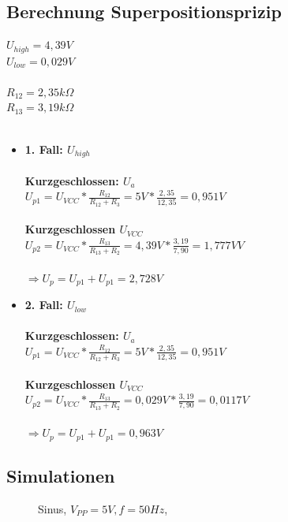 \subsection{Berechnung Superpositionsprizip}
$U_{high}=4,39V$ \\
$U_{low}=0,029V$ \\ \\
$R_{12}=2,35k\Omega$ \\
$R_{13}=3,19k\Omega$ \\ \\
\begin{itemize}
  \item \textbf{1. Fall: $U_{high}$} \\ \\
        \textbf{Kurzgeschlossen: $U_a$ }\\
        $U_{p1} = U_{VCC}*\frac{R_{12}}{R_{12}+R_3} = 5V * \frac{2,35}{12,35} = 0,951V$ \\ \\
        \textbf{Kurzgeschlossen $U_{VCC}$}\\
        $U_{p2} = U_{VCC}*\frac{R_{13}}{R_{13}+R_2} = 4,39V * \frac{3,19}{7,90} = 1,777VV$ \\ \\
        $\Rightarrow U_p = U_{p1} + U_{p1} = 2,728V$

  \item \textbf{2. Fall: $U_{low}$} \\ \\
        \textbf{Kurzgeschlossen: $U_a$ }\\
        $U_{p1} = U_{VCC}*\frac{R_{12}}{R_{12}+R_3} = 5V * \frac{2,35}{12,35} = 0,951V$ \\ \\
        \textbf{Kurzgeschlossen $U_{VCC}$}\\
        $U_{p2} = U_{VCC}*\frac{R_{13}}{R_{13}+R_2} = 0,029V * \frac{3,19}{7,90} = 0,0117V$ \\ \\
        $\Rightarrow U_p = U_{p1} + U_{p1} = 0,963V$
\end{itemize}


\subsection{Simulationen}
\begin{figure}[H]
  \centering
  \caption{Sinus, $V_{PP}=5V, f=50Hz$,}
\end{figure}

